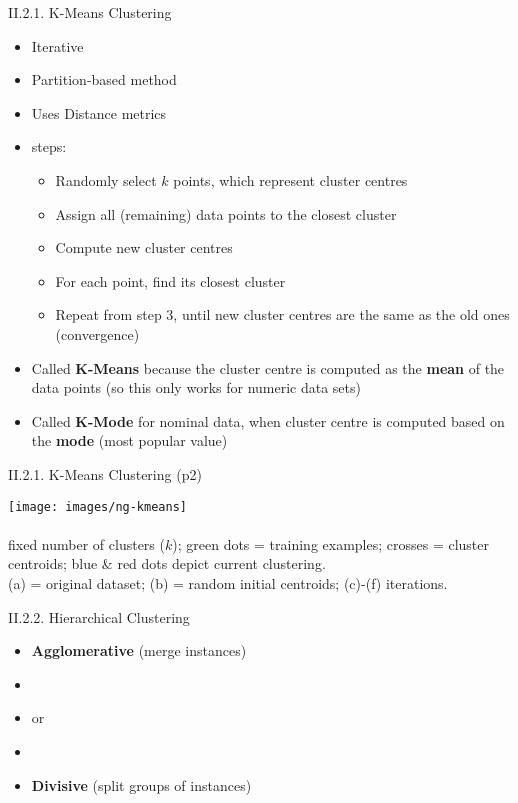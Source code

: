\documentclass[handout]{beamer}
\newcommand{\strong}[1]{\textbf{\color{teal} #1}}
\newcommand{\stronger}[1]{\textbf{\color{purple} #1}}
\begin{document}
\begin{frame}{II.2.1. K-Means Clustering}
\begin{itemize}
\item Iterative
\item Partition-based method
\item Uses Distance metrics
\item steps:
	\begin{itemize}
	\item[1.] Randomly select $k$ points, which represent cluster centres
	\item[2.] Assign all (remaining) data points to the closest cluster
	\item[3.] Compute new cluster centres
	\item[4.] For each point, find its closest cluster
	\item[5.] Repeat from step 3, until new cluster centres are the same as the old ones (convergence)
	\end{itemize}
\item Called \strong{K-Means} because the cluster centre is computed as the \strong{mean} of the data points (so this only works for numeric data sets)
\item Called \strong{K-Mode} for nominal data, when cluster centre is computed based on the \strong{mode} (most popular value)
\end{itemize}
\end{frame}
\begin{frame}{II.2.1. K-Means Clustering (p2)}
\begin{center}
\texttt{[image: images/ng-kmeans]}\\
\cite{ng-see:2022}\\
\footnotesize{fixed number of clusters ($k$); green dots = training examples; crosses = cluster centroids; blue \& red dots depict current clustering.\\
(a) = original dataset; (b) = random initial centroids; (c)-(f) iterations.}
\end{center}
\end{frame}
\begin{frame}{II.2.2. Hierarchical Clustering}
\begin{itemize}
\item \stronger{Agglomerative} (merge instances)
\item[]
\item[] or
\item[]
\item \stronger{Divisive} (split groups of instances)
\end{itemize}
\end{frame}
\end{document}
